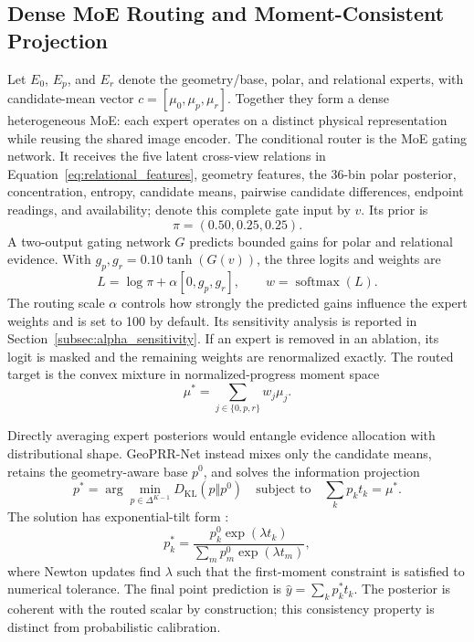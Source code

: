 \documentclass[electronics,article,submit,oneauthor]{Definitions/mdpi}
\newcommand{\modelname}{GeoPRR-Net\xspace}
\begin{document}
\subsection{Dense MoE Routing and Moment-Consistent Projection}
\label{subsec:routing}

Let $E_0$, $E_p$, and $E_r$ denote the geometry/base, polar, and relational experts, with candidate-mean vector $c=[\mu_0,\mu_p,\mu_r]$. Together they form a dense heterogeneous MoE: each expert operates on a distinct physical representation while reusing the shared image encoder. The conditional router is the MoE gating network. It receives the five latent cross-view relations in Equation~\eqref{eq:relational_features}, geometry features, the 36-bin polar posterior, concentration, entropy, candidate means, pairwise candidate differences, endpoint readings, and availability; denote this complete gate input by $v$. Its prior is
\begin{equation}
\pi=(0.50,0.25,0.25).
\label{eq:prior}
\end{equation}
A two-output gating network $G$ predicts bounded gains for polar and relational evidence. With $g_p,g_r=0.10\tanh(G(v))$, the three logits and weights are
\begin{equation}
L=\log\pi+\alpha[0,g_p,g_r],\qquad w=\operatorname{softmax}(L).
\label{eq:router}
\end{equation}
The routing scale $\alpha$ controls how strongly the predicted gains influence the expert weights and is set to 100 by default. Its sensitivity analysis is reported in Section~\ref{subsec:alpha_sensitivity}.
If an expert is removed in an ablation, its logit is masked and the remaining weights are renormalized exactly. The routed target is the convex mixture in normalized-progress moment space
\begin{equation}
\mu^*=\sum_{j\in\{0,p,r\}}w_j\mu_j.
\label{eq:routed_mean}
\end{equation}

Directly averaging expert posteriors would entangle evidence allocation with distributional shape. \modelname instead mixes only the candidate means, retains the geometry-aware base $p^0$, and solves the information projection
\begin{equation}
p^*=\arg\min_{p\in\Delta^{K-1}}D_{\mathrm{KL}}(p\Vert p^0)
\quad\text{subject to}\quad \sum_k p_kt_k=\mu^*.
\label{eq:iprojection}
\end{equation}
The solution has exponential-tilt form \cite{csiszar1975idivergence}:
\begin{equation}
p_k^*=\frac{p_k^0\exp(\lambda t_k)}{\sum_m p_m^0\exp(\lambda t_m)},
\label{eq:tilt}
\end{equation}
where Newton updates find $\lambda$ such that the first-moment constraint is satisfied to numerical tolerance. The final point prediction is $\widehat{y}=\sum_kp_k^*t_k$. The posterior is coherent with the routed scalar by construction; this consistency property is distinct from probabilistic calibration.
\end{document}

